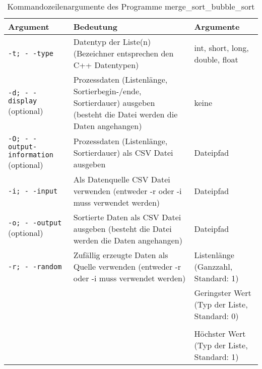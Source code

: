 \begin{table}[h]
\begin{tabular}{|p{5cm}|p{5cm}|p{4cm}|}
\hline
\textbf{Argument} & \textbf{Bedeutung} & \textbf{Argumente}\\
\hline
\texttt{-t; - -type} & Datentyp der Liste(n) (Bezeichner entsprechen den C++ Datentypen)& int, short, long, double, float\\
\hline
\texttt{-d; - -display} (optional) & Prozessdaten (Listenlänge, Sortierbegin-/ende, Sortierdauer) ausgeben (besteht die Datei werden die Daten angehangen)& keine\\
\hline
\texttt{-O; \mbox{- -output-information}} (optional) & Prozessdaten (Listenlänge, Sortierdauer) als \ac{CSV} Datei ausgeben& Dateipfad\\
\hline
\texttt{-i; \mbox{- -input}} & Als Datenquelle \ac{CSV} Datei verwenden (entweder -r oder -i muss verwendet werden)& Dateipfad\\
\hline
\texttt{-o; \mbox{- -output}} (optional) & Sortierte Daten als \ac{CSV} Datei ausgeben (besteht die Datei werden die Daten angehangen)& Dateipfad\\
\hline
\texttt{-r; \mbox{- -random}} & Zufällig erzeugte Daten als Quelle verwenden (entweder -r oder -i muss verwendet werden)& Listenlänge (Ganzzahl, Standard: 1)\\
&& Geringster Wert (Typ der Liste, Standard: 0)\\&&\\
&& Höchster Wert (Typ der Liste, Standard: 1)\\
\hline
\end{tabular}
\caption{Kommandozeilenargumente des Programme merge\_sort\_bubble\_sort}
\label{arguments_compare}
\end{table}